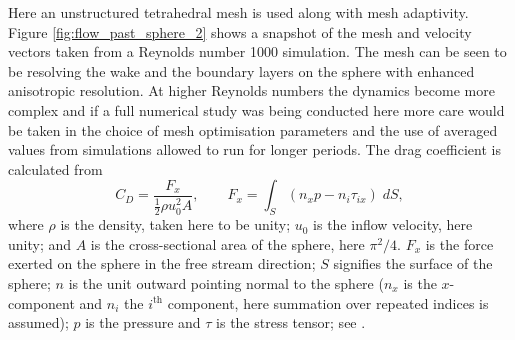 Here an unstructured
tetrahedral mesh is used along with mesh adaptivity. 
Figure \ref{fig:flow_past_sphere_2} shows a snapshot of the
mesh and velocity vectors taken from a Reynolds number 1000 simulation. The
mesh can be seen to be resolving the wake and the boundary layers on the
sphere with enhanced anisotropic resolution. At higher Reynolds numbers the
dynamics become more complex and if a full numerical study was being
conducted here more care would be taken in the choice of mesh optimisation
parameters and the use of averaged values from simulations allowed to run
for longer periods. The drag coefficient is calculated from
\begin{equation}
C_D = \frac{F_x}{\frac{1}{2}\rho u_0^2 A},\qquad F_x = \int_S (n_xp - n_i\tau_{ix})\;dS,
\label{eqn:drag_coeff}
\end{equation}
where $\rho$ is the density, taken here to be unity; 
$u_0$ is the inflow velocity, here unity; 
and $A$ is the cross-sectional area of the sphere, here $\pi^2/4$. 
$F_x$ is the force 
exerted on the sphere in the free stream direction;
$S$ signifies the surface of the sphere; $n$ is the 
unit outward pointing normal to the sphere 
($n_x$ is the $x$-component and $n_i$ the $i^{\textrm{th}}$ 
component, here summation over repeated indices is assumed); 
$p$ is the pressure and $\tau$ is the stress tensor;
see \citet{panton2006}.

